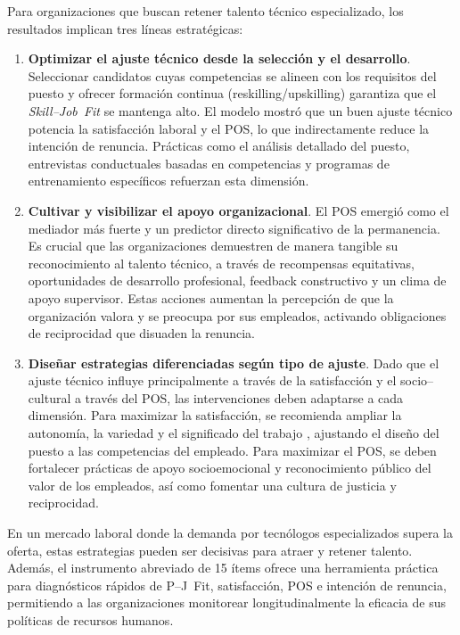 Para organizaciones que buscan retener talento técnico especializado, los resultados implican tres líneas estratégicas:

\begin{enumerate}
\item \textbf{Optimizar el ajuste técnico desde la selección y el desarrollo}. Seleccionar candidatos cuyas competencias se alineen con los requisitos del puesto y ofrecer formación continua (reskilling/upskilling) garantiza que el \emph{Skill--Job Fit} se mantenga alto. El modelo mostró que un buen ajuste técnico potencia la satisfacción laboral y el POS, lo que indirectamente reduce la intención de renuncia. Prácticas como el análisis detallado del puesto, entrevistas conductuales basadas en competencias y programas de entrenamiento específicos refuerzan esta dimensión.
\item \textbf{Cultivar y visibilizar el apoyo organizacional}. El POS emergió como el mediador más fuerte y un predictor directo significativo de la permanencia. Es crucial que las organizaciones demuestren de manera tangible su reconocimiento al talento técnico, a través de recompensas equitativas, oportunidades de desarrollo profesional, feedback constructivo y un clima de apoyo supervisor. Estas acciones aumentan la percepción de que la organización valora y se preocupa por sus empleados, activando obligaciones de reciprocidad que disuaden la renuncia.
\item \textbf{Diseñar estrategias diferenciadas según tipo de ajuste}. Dado que el ajuste técnico influye principalmente a través de la satisfacción y el socio–cultural a través del POS, las intervenciones deben adaptarse a cada dimensión. Para maximizar la satisfacción, se recomienda ampliar la autonomía, la variedad y el significado del trabajo \cite{hackman_work_1980}, ajustando el diseño del puesto a las competencias del empleado. Para maximizar el POS, se deben fortalecer prácticas de apoyo socioemocional y reconocimiento público del valor de los empleados, así como fomentar una cultura de justicia y reciprocidad.
\end{enumerate}

En un mercado laboral donde la demanda por tecnólogos especializados supera la oferta, estas estrategias pueden ser decisivas para atraer y retener talento. Además, el instrumento abreviado de 15 ítems ofrece una herramienta práctica para diagnósticos rápidos de P–J Fit, satisfacción, POS e intención de renuncia, permitiendo a las organizaciones monitorear longitudinalmente la eficacia de sus políticas de recursos humanos.

